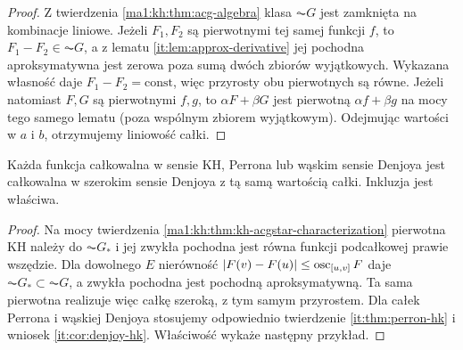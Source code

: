 \begin{proof}
Z twierdzenia \ref{ma1:kh:thm:acg-algebra} klasa $\AC G$ jest zamknięta na kombinacje liniowe.
Jeżeli $F_1,F_2$ są pierwotnymi tej samej funkcji $f$,
to $F_1-F_2\in\AC G$, a z lematu \ref{it:lem:approx-derivative}
jej pochodna aproksymatywna jest zerowa poza sumą dwóch zbiorów wyjątkowych.
Wykazana własność daje $F_1-F_2=\mathrm{const}$, więc przyrosty obu pierwotnych są równe.
Jeżeli natomiast $F,G$ są pierwotnymi $f,g$,
to $\alpha F+\beta G$ jest pierwotną $\alpha f+\beta g$
na mocy tego samego lematu (poza wspólnym zbiorem wyjątkowym).
Odejmując wartości w $a$ i $b$, otrzymujemy liniowość całki.
\end{proof}
\begin{wniosek}
Każda funkcja całkowalna w sensie KH, Perrona lub wąskim sensie Denjoya jest całkowalna w szerokim sensie Denjoya z tą samą wartością całki. Inkluzja jest właściwa.
\end{wniosek}
\begin{proof}
Na mocy twierdzenia \ref{ma1:kh:thm:kh-acgstar-characterization} pierwotna KH należy do $\AC G_*$ i jej zwykła pochodna jest równa funkcji podcałkowej prawie wszędzie. Dla dowolnego $E$ nierówność $|F(v)-F(u)|\le\operatorname{osc}_{[u,v]}F$ daje $\AC G_*\subset\AC G$, a zwykła pochodna jest pochodną aproksymatywną. Ta sama pierwotna realizuje więc całkę szeroką, z tym samym przyrostem. Dla całek Perrona i wąskiej Denjoya stosujemy odpowiednio twierdzenie \ref{it:thm:perron-hk} i wniosek \ref{it:cor:denjoy-hk}. Właściwość wykaże następny przykład.
\end{proof}
